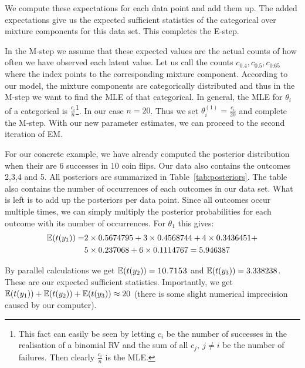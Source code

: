 We compute these expectations for each data point and add them up. The added expectations give
us the expected sufficient statistics of the categorical over mixture components for this data set.
This completes the E-step.

In the M-step we assume that these expected values are the actual counts of how often we have observed each latent value. Let us call the counts 
$ c_{0.4}, c_{0.5}, c_{0.65} $ where the index points to the corresponding mixture component. According to our model, the mixture components are categorically
distributed and thus in the M-step we want to find the MLE of that categorical. In general, the MLE for $ \theta_{i} $ of a categorical is
$ \frac{c_{i}}{n} $\footnote{This fact can easily be seen by letting $ c_{i} $ be the number of successes in the realisation of a binomial RV and the sum of all
$ c_{j},~j \not = i $ be the number of failures. Then clearly $ \frac{c_{i}}{n} $ is the MLE.}. In our case $ n=20 $. Thus we set 
$ \theta_{i}^{(1)} = \frac{c_{i}}{20} $ and complete the M-step. With our new parameter estimates, we can proceed to the second iteration of EM.

For our concrete example, we have already computed the posterior distribution when their are 6 successes
in 10 coin flips. Our data also contains the outcomes 2,3,4 and 5. All posteriors are summarized in 
Table~\eqref{tab:posteriors}. The table also contains the number of occurrences of each outcomes in our
data set. What is left is to add up the posteriors per data point. Since all outcomes occur multiple
times, we can simply multiply the posterior probabilities for each outcome with its number of occurrences.
For $ \theta_{1} $ this gives:
\begin{align}
\mathbb{E}(t(y_{1})) = &2 \times 0.5674795 + 3 \times 0.4568744 + 4 \times 0.3436451 + \\
&5 \times 0.237068 + 6 \times 0.1114767 = 5.946387 \nonumber
\end{align}

By parallel calculations we get $ \mathbb{E}(t(y_{2})) = \textsc{10.7153} $ and $ \mathbb{E}(t(y_{3})) = 3.338238 $. 
These are our expected sufficient statistics. Importantly, we get 
$ \mathbb{E}(t(y_{1})) + \mathbb{E}(t(y_{2})) + \mathbb{E}(t(y_{3})) \approx 20 $ (there is some slight numerical imprecision
caused by our computer). 


